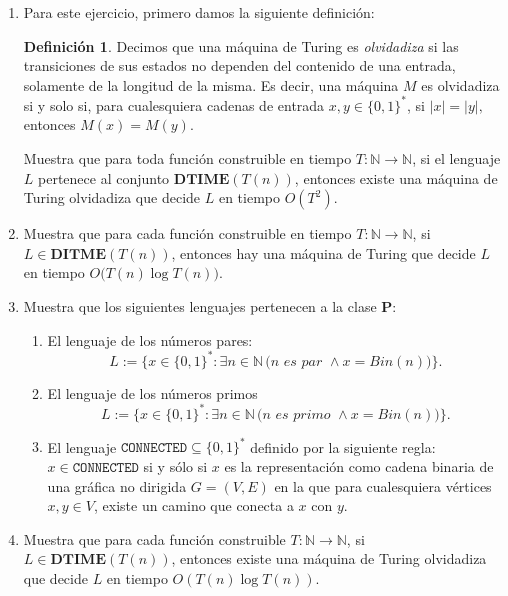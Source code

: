 \documentclass[a4paper,12pt]{article}
\theoremstyle{definition}
\newtheorem{definition}{Definici\'on}[section]
\begin{document}
\begin{enumerate}
        \item Para este ejercicio, primero damos la siguiente definición:
        \begin{definition}\label{oblivous tm}
        Decimos que una máquina de Turing es \textit{olvidadiza} si las transiciones de sus estados no dependen del contenido de una entrada, solamente de la longitud de la misma. Es decir, una máquina $M$ es olvidadiza si y solo si, para cualesquiera cadenas de entrada $x, y\in \{0,1\}^*$, si $\lvert x\rvert = \lvert y \rvert,$ entonces $M(x)=M(y)$.
        \end{definition}
        Muestra que para toda función construible en tiempo $T:\mathbb{N}\longrightarrow \mathbb{N}$, si el lenguaje $L$ pertenece al conjunto $\mathbf{DTIME}(T(n))$, entonces existe una máquina de Turing olvidadiza que decide $L$ en tiempo $O(T^2)$.
        \item Muestra que para cada función construible en tiempo $T:\mathbb{N}\longrightarrow \mathbb{N}$, si $L\in \mathbf{DITME}(T(n))$, entonces hay una máquina de Turing que decide $L$ en tiempo $O\big(T(n)\log T(n)\big)$.

        \item Muestra que los siguientes lenguajes pertenecen a la clase $\mathbf{P}$:
        \begin{enumerate}
            \item El lenguaje de los números pares:
            \[L:=\big\{x\in \{0,1\}^*:\exists n\in \mathbb{N}\,\big(n\textit{ es par }\wedge x=Bin(n)\big)\big\}.\]
            \item El lenguaje de los números primos \[L:=\big\{x\in \{0,1\}^*:\exists n\in \mathbb{N}\,\big(n\textit{ es primo }\wedge x=Bin(n)\big)\big\}.\]
            \item El lenguaje $\texttt{CONNECTED}\subseteq\{0,1\}^*$ definido por la siguiente regla:$x\in \texttt{CONNECTED}$ si y sólo si $x$ es la representación como cadena binaria de una gráfica no dirigida $G=(V,E)$ en la que para cualesquiera vértices $x,y\in V$, existe un camino que conecta a $x$ con $y$. 
        \end{enumerate}
        \item Muestra que para cada función construible $T:\mathbb{N}\longrightarrow \mathbb{N}$, si $L\in \mathbf{DTIME}(T(n))$, entonces existe una máquina de Turing olvidadiza que decide $L$ en tiempo $O(T(n)\log T(n))$.
\end{enumerate}
\end{document}
